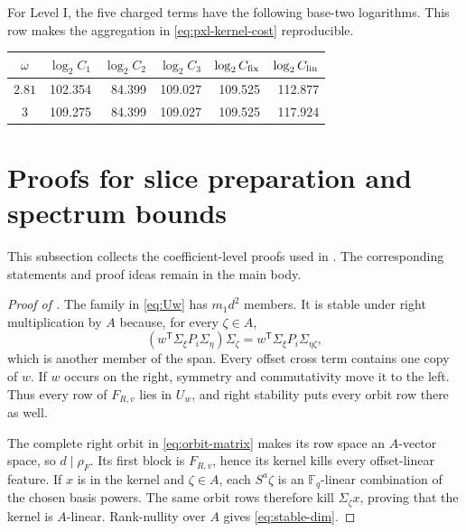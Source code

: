 \documentclass[11pt]{article}
\newcommand{\F}{\mathbb F}
\newcommand{\transpose}{\mathsf T}
\begin{document}
For Level I, the five charged terms have the following base-two logarithms.
This row makes the aggregation in \eqref{eq:pxl-kernel-cost} reproducible.
\begin{center}
\scriptsize
\begin{tabular}{@{}c r r r r r@{}}
\toprule
$\omega$ & $\log_2 C_1$ & $\log_2 C_2$ & $\log_2 C_3$
& $\log_2 C_{\rm fix}$ & $\log_2 C_{\rm lin}$\\
\midrule
$2.81$ & 102.354 & 84.399 & 109.027 & 109.525 & 112.877\\
$3$    & 109.275 & 84.399 & 109.027 & 109.525 & 117.924\\
\bottomrule
\end{tabular}
\end{center}

\section{Proofs for slice preparation and spectrum bounds}
\label{app:slice-proofs}

This subsection collects the coefficient-level proofs used in
.  The corresponding
statements and proof ideas remain in the main body.

\begin{proof}[Proof of ]
The family in \eqref{eq:Uw} has $m_1d^2$ members.  It is stable under right
multiplication by $A$ because, for every $\zeta\in A$,
\[
 (w^\transpose\Sigma_\xi P_i\Sigma_\eta)\Sigma_\zeta
 =w^\transpose\Sigma_\xi P_i\Sigma_{\eta\zeta},
\]
which is another member of the span.  Every offset cross term contains one
copy of $w$.  If $w$ occurs on the right, symmetry and commutativity move it to
the left.  Thus every row of $F_{R,v}$ lies in $U_w$, and right stability puts
every orbit row there as well.

The complete right orbit in \eqref{eq:orbit-matrix} makes its row space an
$A$-vector space, so $d\mid\rho_F$.  Its first block is $F_{R,v}$, hence its
kernel kills every offset-linear feature.  If $x$ is in the kernel and
$\zeta\in A$, each $S^a\zeta$ is an $\F_q$-linear combination of the chosen
basis powers.  The same orbit rows therefore kill $\Sigma_\zeta x$, proving
that the kernel is $A$-linear.  Rank-nullity over $A$ gives
\eqref{eq:stable-dim}.
\end{proof}
\end{document}
